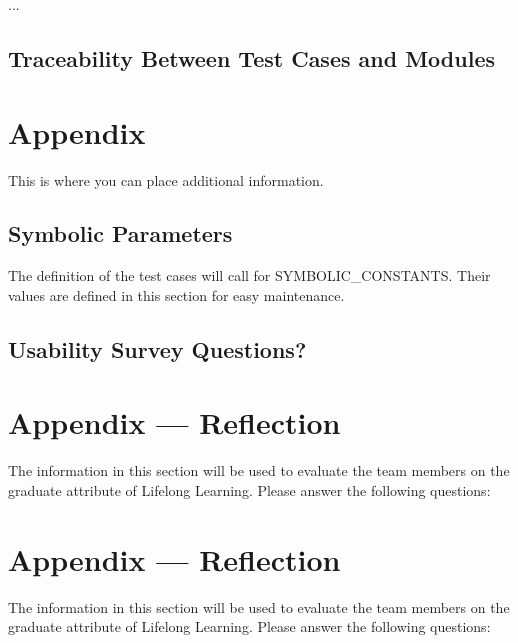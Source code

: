 \documentclass[12pt, titlepage]{article}
\begin{document}
...

\subsection{Traceability Between Test Cases and Modules}






\newpage

\section{Appendix}

This is where you can place additional information.

\subsection{Symbolic Parameters}

The definition of the test cases will call for SYMBOLIC\_CONSTANTS.
Their values are defined in this section for easy maintenance.

\subsection{Usability Survey Questions?}


\newpage{}
\section*{Appendix --- Reflection}

The information in this section will be used to evaluate the team members on the
graduate attribute of Lifelong Learning.  Please answer the following questions:

\newpage{}
\section*{Appendix --- Reflection}


The information in this section will be used to evaluate the team members on the
graduate attribute of Lifelong Learning.  Please answer the following questions:
\end{document}
